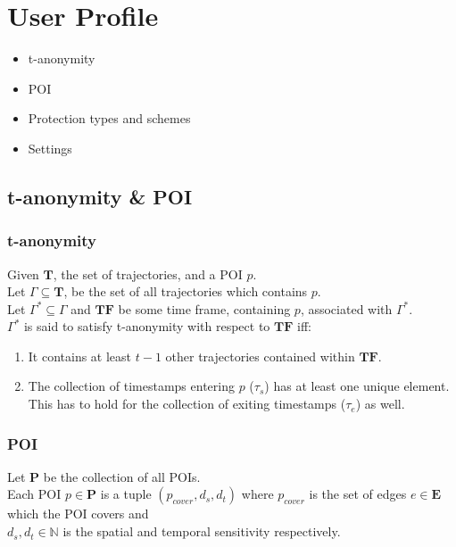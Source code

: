 \section{User Profile}

\begin{frame}[red]

\begin{itemize}
\item t-anonymity
\item POI
\item Protection types and schemes
\item Settings
\end{itemize}


\end{frame}


\subsection{t-anonymity \& POI} %
\begin{frame}[red] %
\frametitle{t-anonymity}

\begin{definition}
Given $\mathbf{T}$, the set of trajectories, and a POI $p$.\\
Let $\Gamma \subseteq \mathbf{T}$, be the set of all trajectories which contains $p$.\\
Let $\Gamma^* \subseteq \Gamma$ and $\mathbf{TF}$ be some time frame, containing $p$, associated with $\Gamma^*$.\\
$\Gamma^*$ is said to satisfy t-anonymity with respect to $\mathbf{TF}$ iff:

\begin{enumerate}
	\item It contains at least $t-1$ other trajectories contained within $\mathbf{TF}$.

	\item The collection of timestamps entering $p$ ($\tau_{s}$) has at least one unique element. This has to hold for the collection of exiting timestamps ($\tau_{e}$) as well.
\end{enumerate}
\end{definition}

\end{frame}

\begin{frame}[red] %
\frametitle{POI}

\begin{definition}
Let $\mathbf{P}$ be the collection of all POIs.\\
Each POI $p \in \mathbf{P}$ is a tuple $(p_{cover}, d_s, d_t)$ where $p_{cover}$ is the set of edges $e \in \mathbf{E}$ which the POI covers and \\
$d_s, d_t \in \mathbb{N}$ is the spatial and temporal sensitivity respectively.
\end{definition}

\end{frame}

